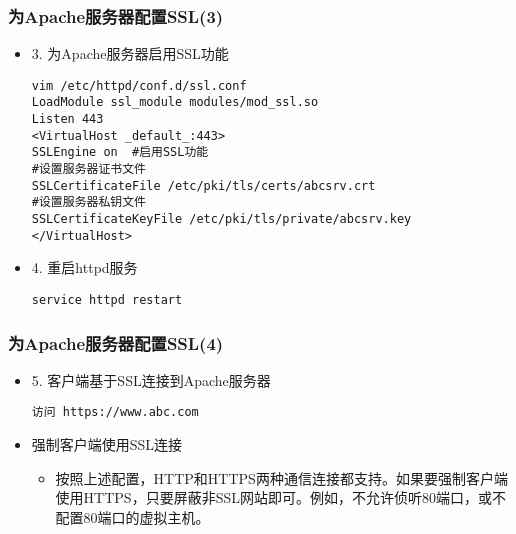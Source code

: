 \documentclass[xcolor=svgnames,presentation]{beamer}
\begin{document}
\begin{frame}[fragile]
\frametitle{为Apache服务器配置SSL(3)}
\label{sec-4-7}
\begin{itemize}

\item 3. 为Apache服务器启用SSL功能\\
\label{sec-4-7-1}%
\begin{verbatim}
vim /etc/httpd/conf.d/ssl.conf
LoadModule ssl_module modules/mod_ssl.so
Listen 443
<VirtualHost _default_:443>
SSLEngine on  #启用SSL功能
#设置服务器证书文件
SSLCertificateFile /etc/pki/tls/certs/abcsrv.crt
#设置服务器私钥文件
SSLCertificateKeyFile /etc/pki/tls/private/abcsrv.key
</VirtualHost>
\end{verbatim}

\item 4. 重启httpd服务\\
\label{sec-4-7-2}%
\begin{verbatim}
service httpd restart
\end{verbatim}
\end{itemize} %
\end{frame}
\begin{frame}[fragile]
\frametitle{为Apache服务器配置SSL(4)}
\label{sec-4-8}
\begin{itemize}

\item 5. 客户端基于SSL连接到Apache服务器\\
\label{sec-4-8-1}%
\begin{verbatim}
访问 https://www.abc.com
\end{verbatim}

\item 强制客户端使用SSL连接
\label{sec-4-8-2}%
\begin{itemize}

\item 按照上述配置，HTTP和HTTPS两种通信连接都支持。如果要强制客户端使用HTTPS，只要屏蔽非SSL网站即可。例如，不允许侦听80端口，或不配置80端口的虚拟主机。
\label{sec-4-8-2-1}%
\end{itemize} %
\end{itemize} %
\end{frame}
\end{document}
